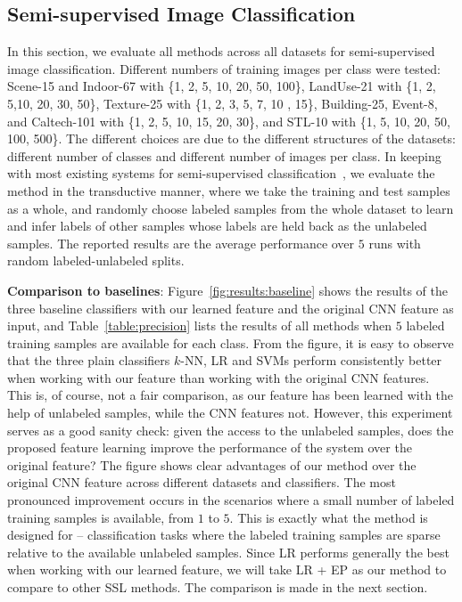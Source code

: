 \documentclass[preprint,12pt,3p]{elsarticle}
\begin{document}
\subsection{Semi-supervised Image Classification}
\label{sec:sic}
In this section, we evaluate all methods across all datasets for
semi-supervised image classification. Different numbers of training
images per class were tested: Scene-15 and Indoor-67 with \{1, 2,
5, 10, 20, 50, 100\}, LandUse-21 with \{1, 2, 5,10, 20, 30, 50\},
Texture-25 with \{1, 2, 3, 5, 7, 10 , 15\}, Building-25, Event-8,
and Caltech-101 with \{1, 2, 5, 10, 15, 20, 30\}, and STL-10
with \{1, 5, 10, 20, 50, 100, 500\}. The different choices are due
to the different structures of the datasets: different number of
classes and different number of images per class.  In keeping with
most existing systems for semi-supervised
classification~\citep{Zhu:Harmonic:03, Zhou:nips:04,
  icml10:large:graph:ssl, Fergus09, eccv10:ssl, ecml14:ssl}, we
evaluate the method in the transductive manner, where we take the
training and test samples as a whole, and randomly choose labeled
samples from the whole dataset to learn and infer labels of other
samples whose labels are held back as the unlabeled samples.  The
reported results are the average performance over $5$ runs with random
labeled-unlabeled splits.

\textbf{Comparison to baselines}: Figure~\ref{fig:results:baseline}
shows the results of the three baseline classifiers with our learned
feature and the original CNN feature as input, and
Table~\ref{table:precision} lists the results of all methods when $5$
labeled training samples are available for each class. From the figure,
it is easy to observe that the three plain classifiers $k$-NN, LR and
SVMs perform consistently better when working with our feature than
working with the original CNN features.  This is, of course, not a fair
comparison, as our feature has been learned with the help of unlabeled
samples, while the CNN features not. However, this experiment
serves as a good sanity check: given the access to the unlabeled
samples, does the proposed feature learning improve the performance of
the system over the original feature? The figure shows clear
advantages of our method over the original CNN feature across
different datasets and classifiers. The most pronounced improvement
occurs in the scenarios where a small number of labeled training
samples is available, \eg from $1$ to $5$. This is exactly what the
method is designed for -- classification tasks where the labeled
training samples are sparse relative to the available unlabeled
samples.  Since LR performs generally the best when working with our
learned feature, we will take LR + EP as our method to compare to
other SSL methods. The comparison is made in the next section.
\end{document}
